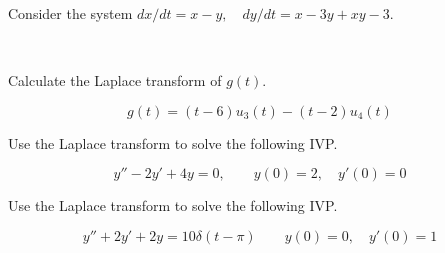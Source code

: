 \documentclass[12pt]{exam}
\begin{document}
\begin{questions}
    
    

\newpage \InitialsRight
    \question[11] 
    Consider the system $\displaystyle dx/dt = x-y, \quad dy/dt = x-3y+xy - 3$. %

    
    
    

\newpage \InitialsLeft \\ \Scratch 

\newpage \InitialsRight
    
    \question[5] Calculate the Laplace transform of $g(t)$. 
    
    $$g(t) = (t-6)u_3(t)  - (t - 2)u_4(t) $$ %

\newpage \InitialsLeft

    \question[10] Use the Laplace transform to solve the following IVP.

    $$\displaystyle y''-2y'+4y=0,\qquad y(0)=2,\quad y'(0)=0$$ %
    

\newpage \InitialsRight

    \question[10] Use the Laplace transform to solve the following IVP.

    $$\displaystyle y''+2y'+2y=10\delta(t-\pi)\qquad y(0)=0,\quad y'(0)=1 $$ %



    
\end{questions}
\end{document}
